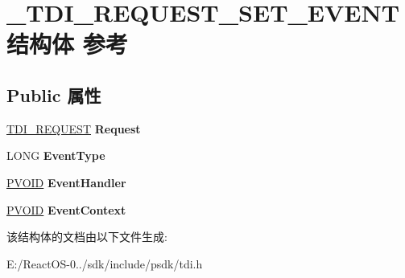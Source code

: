 \hypertarget{struct___t_d_i___r_e_q_u_e_s_t___s_e_t___e_v_e_n_t}{}\section{\+\_\+\+T\+D\+I\+\_\+\+R\+E\+Q\+U\+E\+S\+T\+\_\+\+S\+E\+T\+\_\+\+E\+V\+E\+N\+T结构体 参考}
\label{struct___t_d_i___r_e_q_u_e_s_t___s_e_t___e_v_e_n_t}
\subsection*{Public 属性}
\begin{DoxyCompactItemize}
\item 
\mbox{\label{struct___t_d_i___r_e_q_u_e_s_t___s_e_t___e_v_e_n_t_a8c2de33b7087f63baa1b25ac64f286dc}} 
\hyperlink{struct___t_d_i___r_e_q_u_e_s_t}{T\+D\+I\+\_\+\+R\+E\+Q\+U\+E\+ST} {\bfseries Request}
\item 
\mbox{\label{struct___t_d_i___r_e_q_u_e_s_t___s_e_t___e_v_e_n_t_a67f874305f2ba33a93fc4234175f0b54}} 
L\+O\+NG {\bfseries Event\+Type}
\item 
\mbox{\label{struct___t_d_i___r_e_q_u_e_s_t___s_e_t___e_v_e_n_t_ac0a0cd3012819596ff4b3121d11ba0ea}} 
\hyperlink{interfacevoid}{P\+V\+O\+ID} {\bfseries Event\+Handler}
\item 
\mbox{\label{struct___t_d_i___r_e_q_u_e_s_t___s_e_t___e_v_e_n_t_aeacadbb627f8b93189a0a9524aba1251}} 
\hyperlink{interfacevoid}{P\+V\+O\+ID} {\bfseries Event\+Context}
\end{DoxyCompactItemize}


该结构体的文档由以下文件生成\+:\begin{DoxyCompactItemize}
\item 
E\+:/\+React\+O\+S-\/0../sdk/include/psdk/tdi.\+h\end{DoxyCompactItemize}
